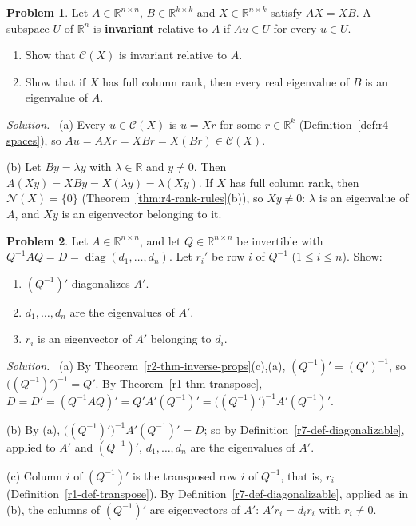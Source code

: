 \documentclass[12pt]{article}
\newcommand{\R}{\mathbb R}
\DeclareMathOperator{\diag}{diag}
\theoremstyle{definition}
\newtheorem{problem}{Problem}
\newenvironment{solution}{\par\noindent\textit{Solution.}\ }{\par\smallskip}
\begin{document}
\begin{problem}\label{r7-ex-invariant}
Let \(A\in\R^{n\times n}\), \(B\in\R^{k\times k}\) and \(X\in\R^{n\times k}\) satisfy \(AX=XB\). A subspace \(U\) of \(\R^n\) is
\textbf{invariant} relative to \(A\) if \(Au\in U\) for every \(u\in U\).
\begin{enumerate}
\item Show that \(\mathcal C(X)\) is invariant relative to \(A\).
\item Show that if \(X\) has full column rank, then every real eigenvalue of \(B\) is an eigenvalue of \(A\).
\end{enumerate}
\end{problem}
\begin{solution}
(a) Every \(u\in\mathcal C(X)\) is \(u=Xr\) for some \(r\in\R^k\) (Definition~\ref{def:r4-spaces}), so
\(Au=AXr=XBr=X(Br)\in\mathcal C(X)\).

(b) Let \(By=\lambda y\) with \(\lambda\in\R\) and \(y\ne0\). Then \(A(Xy)=XBy=X(\lambda y)=\lambda(Xy)\). If \(X\) has full
column rank, then \(\mathcal N(X)=\{0\}\) (Theorem~\ref{thm:r4-rank-rules}(b)), so \(Xy\ne0\): \(\lambda\) is an eigenvalue of
\(A\), and \(Xy\) is an eigenvector belonging to it.
\end{solution}

\begin{problem}\label{r7-ex-left-eigenvectors}
Let \(A\in\R^{n\times n}\), and let \(Q\in\R^{n\times n}\) be invertible with \(Q^{-1}AQ=D=\diag(d_1,\dots,d_n)\). Let \(r_i'\) be
row \(i\) of \(Q^{-1}\) (\(1\leqslant i\leqslant n\)). Show:
\begin{enumerate}
\item \((Q^{-1})'\) diagonalizes \(A'\).
\item \(d_1,\dots,d_n\) are the eigenvalues of \(A'\).
\item \(r_i\) is an eigenvector of \(A'\) belonging to \(d_i\).
\end{enumerate}
\end{problem}
\begin{solution}
(a) By Theorem~\ref{r2-thm-inverse-props}(c),(a), \((Q^{-1})'=(Q')^{-1}\), so \(\bigl((Q^{-1})'\bigr)^{-1}=Q'\). By
Theorem~\ref{r1-thm-transpose},
\(D=D'=(Q^{-1}AQ)'=Q'A'(Q^{-1})'=\bigl((Q^{-1})'\bigr)^{-1}A'(Q^{-1})'\).

(b) By (a), \(\bigl((Q^{-1})'\bigr)^{-1}A'(Q^{-1})'=D\); so by Definition~\ref{r7-def-diagonalizable}, applied to \(A'\) and
\((Q^{-1})'\), \(d_1,\dots,d_n\) are the eigenvalues of \(A'\).

(c) Column \(i\) of \((Q^{-1})'\) is the transposed row \(i\) of \(Q^{-1}\), that is, \(r_i\)
(Definition~\ref{r1-def-transpose}). By Definition~\ref{r7-def-diagonalizable}, applied as in (b), the columns of
\((Q^{-1})'\) are eigenvectors of \(A'\): \(A'r_i=d_ir_i\) with \(r_i\ne0\).
\end{solution}
\end{document}
